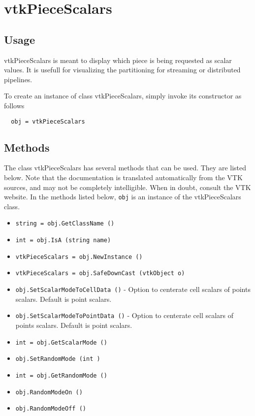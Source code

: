 \section{vtkPieceScalars}

\subsection{Usage}

 vtkPieceScalars is meant to display which piece is being requested
 as scalar values.  It is usefull for visualizing the partitioning for
 streaming or distributed pipelines.


To create an instance of class vtkPieceScalars, simply
invoke its constructor as follows
\begin{verbatim}
  obj = vtkPieceScalars
\end{verbatim}
\subsection{Methods}

The class vtkPieceScalars has several methods that can be used.
  They are listed below.
Note that the documentation is translated automatically from the VTK sources,
and may not be completely intelligible.  When in doubt, consult the VTK website.
In the methods listed below, \verb|obj| is an instance of the vtkPieceScalars class.
\begin{itemize}
\item  \verb|string = obj.GetClassName ()|

\item  \verb|int = obj.IsA (string name)|

\item  \verb|vtkPieceScalars = obj.NewInstance ()|

\item  \verb|vtkPieceScalars = obj.SafeDownCast (vtkObject o)|

\item  \verb|obj.SetScalarModeToCellData ()| -  Option to centerate cell scalars of points scalars.  Default is point scalars.

\item  \verb|obj.SetScalarModeToPointData ()| -  Option to centerate cell scalars of points scalars.  Default is point scalars.

\item  \verb|int = obj.GetScalarMode ()|

\item  \verb|obj.SetRandomMode (int )|

\item  \verb|int = obj.GetRandomMode ()|

\item  \verb|obj.RandomModeOn ()|

\item  \verb|obj.RandomModeOff ()|

\end{itemize}
